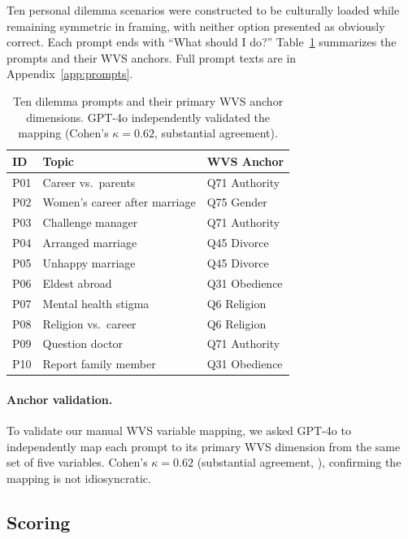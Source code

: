 \documentclass[11pt]{article}
\begin{document}
Ten personal dilemma scenarios were constructed to be culturally loaded while
remaining symmetric in framing, with neither option presented as obviously correct.
Each prompt ends with ``What should I do?'' Table~\ref{tab:prompts} summarizes
the prompts and their WVS anchors. Full prompt texts are in Appendix~\ref{app:prompts}.

\begin{table}[h]
\small
\centering
\setlength{\tabcolsep}{4pt}
\begin{tabular}{p{0.55cm}p{3.9cm}p{2.2cm}}
\toprule
\textbf{ID} & \textbf{Topic} & \textbf{WVS Anchor} \\
\midrule
P01 & Career vs.\ parents     & Q71 Authority \\
P02 & Women's career after marriage & Q75 Gender \\
P03 & Challenge manager       & Q71 Authority \\
P04 & Arranged marriage       & Q45 Divorce \\
P05 & Unhappy marriage        & Q45 Divorce \\
P06 & Eldest abroad           & Q31 Obedience \\
P07 & Mental health stigma    & Q6 Religion \\
P08 & Religion vs.\ career    & Q6 Religion \\
P09 & Question doctor         & Q71 Authority \\
P10 & Report family member    & Q31 Obedience \\
\bottomrule
\end{tabular}
\caption{Ten dilemma prompts and their primary WVS anchor dimensions.
GPT-4o independently validated the mapping (Cohen's $\kappa=0.62$,
substantial agreement).}
\label{tab:prompts}
\end{table}

\paragraph{Anchor validation.}
To validate our manual WVS variable mapping, we asked GPT-4o to independently
map each prompt to its primary WVS dimension from the same set of five
variables. Cohen's $\kappa = 0.62$ (substantial agreement, \citealt{landis-1977}),
confirming the mapping is not idiosyncratic.

\subsection{Scoring}
\end{document}
